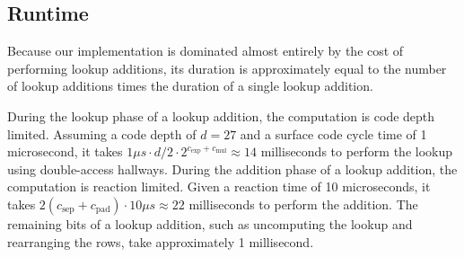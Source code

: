 \documentclass[superscriptaddress,notitlepage,longbibliography]{revtex4-1}
\theoremstyle{definition}
\theoremstyle{definition}
\newcommand{\gexp}{{c_{\text{exp}}}}
\newcommand{\gmul}{{c_{\text{mul}}}}
\newcommand{\gsep}{{c_{\text{sep}}}}
\newcommand{\gpad}{{c_{\text{pad}}}}
\begin{document}
\begin{figure}
    \label{fig:addition-layout-3d}
\end{figure}


\subsection{Runtime}

Because our implementation is dominated almost entirely by the cost of performing lookup additions, its duration is approximately equal to the number of lookup additions times the duration of a single lookup addition.

During the lookup phase of a lookup addition, the computation is code depth limited.
Assuming a code depth of $d=27$ and a surface code cycle time of 1 microsecond, it takes $1 \mu s \cdot d/2 \cdot 2^{\gexp + \gmul} \approx 14$ milliseconds to perform the lookup using double-access hallways.
During the addition phase of a lookup addition, the computation is reaction limited.
Given a reaction time of 10 microseconds, it takes $2(\gsep + \gpad) \cdot 10 \mu s \approx 22$ milliseconds to perform the addition.
The remaining bits of a lookup addition, such as uncomputing the lookup and rearranging the rows, take approximately 1 millisecond.
\end{document}
